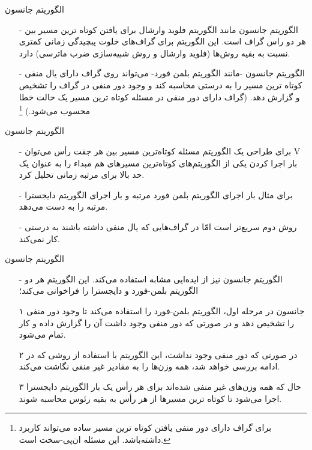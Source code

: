 
\begin{frame}{الگوریتم جانسون}
\begin{itemize}\itemr
\item[-]
الگوریتم جانسون مانند الگوریتم فلوید وارشال برای یافتن کوتاه ترین مسیر بین هر دو راس گراف است. این الگوریتم برای گراف‌های خلوت پبچیدگی زمانی کمتری نسبت به بقیه روش‌ها (فلوید وارشال و روش شبیه‌سازی ضرب ماترسی) دارد.

\item[-]
الگوریتم جانسون -مانند الگوریتم بلمن فورد- می‌تواند روی گراف دارای یال منفی کوتاه ترین مسیر را به درستی محاسبه کند و وجود دور منفی در گراف را تشخیص و گزارش دهد. (گراف دارای دور منفی در مسئله کوتاه ترین مسیر یک حالت خطا محسوب می‌شود.)
\footnote{برای گراف دارای دور منفی یافتن کوتاه ترین مسیر ساده می‌تواند کاربرد داشته‌باشد. این مسئله ان‌پی-سخت است.}
\end{itemize}
\end{frame}

\begin{frame}{الگوریتم جانسون}
	\begin{itemize}\itemr
\item[-]
برای طراحی یک الگوریتم مسئله کوتاه‌ترین مسیر بین هر جفت رأس می‌توان V بار اجرا کردن یکی از الگوریتم‌های کوتاه‌ترین مسیرهای هم مبداء را به عنوان یک حد بالا برای مرتبه زمانی تحلیل کرد.

\item[-]
برای مثال
بار اجرای الگوریتم بلمن فورد مرتبه
و
بار اجرای الگوریتم دایجسترا مرتبه
را به دست می‌دهد.
\item[-]
روش دوم سریع‌تر است امّا در گراف‌‌هایی که یال منفی داشته باشند به درستی کار نمی‌کند.
	\end{itemize}
\end{frame}

\begin{frame}{الگوریتم جانسون}
\begin{itemize}\itemr
\item[-]
الگوریتم جانسون نیز از ایده‌ایی مشابه استفاده می‌کند. این الگوریتم هر دو الگوریتم بلمن-فورد و دایجسترا را فراخوانی می‌کند؛
\item[۱]
جانسون در مرحله اول، الگوریتم بلمن-فورد را استفاده می‌کند تا وجود دور منفی را تشخیص دهد و در صورتی که دور منفی وجود داشت آن را گزارش داده و کار تمام می‌شود.
\item[۲]
در صورتی که دور منفی وجود نداشت، این الگوریتم با استفاده از روشی که در ادامه بررسی خواهد شد، همه وزن‌ها را به مقادیر غیر منفی نگاشت می‌کند.
\item[۳]
حال که همه وزن‌‌های غیر منفی شده‌اند برای هر رأس یک بار الگوریتم دایجسترا اجرا می‌شود تا کوتاه ترین مسیرها از هر رأس به بقیه رئوس محاسبه شوند.
\end{itemize}
\end{frame}

